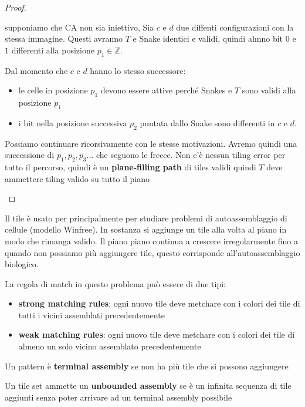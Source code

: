 \begin{teorema}
\begin{proof}
\begin{itemize}
                  supponiamo che CA non sia iniettivo, Sia $c$ e $d$
                  due diffenti configurazioni con la stessa immagine. Questi
                  avranno $T$ e Snake identici e validi, quindi ahnno bit $0$ e $1$ differenti
                  alla posizione $p_1\in \mathbb{Z}$.

                  Dal momento che $c$ e $d$ hanno lo stesso successore:
                  \begin{itemize}
                      \item le celle in posizione $p_1$ devono essere attive perché
                            Snakes e $T$ sono validi alla posizione $p_1$
                      \item i bit nella posizione successiva $p_2$ puntata dallo Snake
                            sono differenti in $c$ e $d$.
                  \end{itemize}
                  Possiamo continuare ricorsivamente con le stesse motivazioni.
                  Avremo quindi una successione di $p_1,p_2,p_3\dots$ che seguono le
                  frecce. Non c'è nessun tiling error per tutto il percorso, quindi
                  è un \textbf{plane-filling path} di tiles validi quindi $T$ deve
                  ammettere tiling valido su tutto il piano
        \end{itemize}
    \end{proof}
\end{teorema}

Il tile è usato per principalmente per studiare problemi di autoassemblaggio di
cellule (modello Winfree). In sostanza si aggiunge un tile alla volta al piano in modo che rimanga
valido. Il piano piano continua a crescere irregolarmente fino a quando non possiamo
più aggiungere tile, questo corrisponde all'autoassemblaggio biologico.

La regola di match in questo problema può essere di due tipi:
\begin{itemize}
    \item \textbf{strong matching rules}: ogni nuovo tile deve metchare con i colori
          dei tile di tutti i vicini assemblati precedentemente
    \item \textbf{weak matching rules}: ogni nuovo tile deve metchare con i colori
          dei tile di almeno un solo vicino assemblato precedentemente
\end{itemize}

\begin{definizione} 
    Un pattern è \textbf{terminal assembly} se non ha più tile che si possono aggiungere
\end{definizione}
\begin{definizione} 
    Un tile set ammette un \textbf{unbounded assembly} se è un infinita sequenza
    di tile aggiunti senza poter arrivare ad un terminal assembly possibile
\end{definizione}

